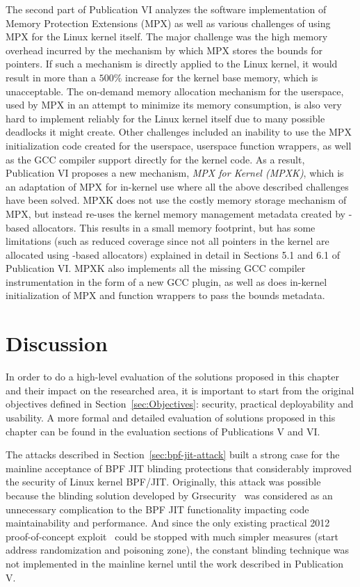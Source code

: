 The second part of Publication VI analyzes the software implementation of \intel Memory Protection Extensions (MPX) as well as various challenges of using MPX for the Linux kernel itself. The major challenge was the high memory overhead incurred by the mechanism by which MPX stores the bounds for pointers. If such a mechanism is directly applied to the Linux kernel, it would result in more than a $500\%$ increase for the kernel base memory, which is unacceptable. The on-demand memory allocation mechanism for the userspace, used by MPX in an attempt to minimize its memory consumption, is also very hard to implement reliably for the Linux kernel itself due to many possible deadlocks it might create. Other challenges included an inability to use the MPX initialization code created for the userspace, userspace function wrappers, as well as the GCC compiler support directly for the kernel code.
As a result, Publication VI proposes a new mechanism, \emph{MPX for Kernel (MPXK)}, which is an adaptation of \intel MPX for in-kernel use where all the above described challenges have been solved. MPXK does not use the costly memory storage mechanism of MPX, but instead re-uses the kernel memory management metadata created by -based allocators. This results in a small memory footprint, but has some limitations (such as reduced coverage since not all pointers in the kernel are allocated using -based allocators) explained in detail in Sections 5.1 and 6.1 of Publication VI. MPXK also implements all the missing GCC compiler instrumentation in the form of a new GCC plugin, as well as does in-kernel initialization of MPX and function wrappers to pass the bounds metadata. 

\section{Discussion}

In order to do a high-level evaluation of the solutions proposed in this chapter and their impact on the researched area, it is important to start from the original objectives defined in Section~\ref{sec:Objectives}: security, practical deployability and usability. A more formal and detailed evaluation of solutions proposed in this chapter can be found in the evaluation sections of Publications V and VI. 

The attacks described in Section~\ref{sec:bpf-jit-attack} built a strong case for the mainline acceptance of BPF JIT blinding protections that considerably improved the security of Linux kernel BPF/JIT. Originally, this attack was possible because the blinding solution developed by Grsecurity~\cite{grsecurity} was considered as an unnecessary complication to the BPF JIT functionality impacting code maintainability and performance. And since the only existing practical 2012 proof-of-concept exploit~\cite{mcallister2012attacking} could be stopped with much simpler measures (start address randomization and poisoning zone), the constant blinding technique was not implemented in the mainline kernel until the work described in Publication V. 

